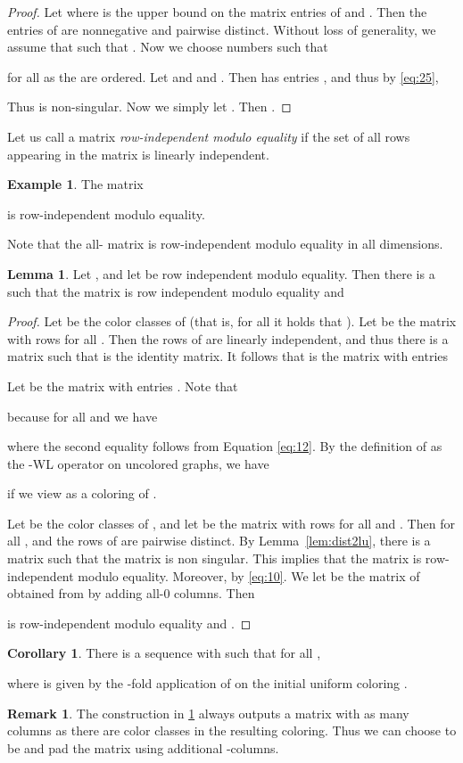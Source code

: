 \documentclass[letterpaper]{article}
\theoremstyle{definition}
\newtheorem{lemma}[theorem]{Lemma}
\newtheorem{corollary}[theorem]{Corollary}
\newtheorem{example}[theorem]{Example}
\newtheorem{remark}[theorem]{Remark}
\begin{document}
\begin{proof}
	Let  where  is the upper bound on the matrix entries of   and . 
	Then the entries of  are nonnegative and pairwise distinct.
	Without loss of generality, we assume that  such that . Now we choose numbers  such that
	
	for all  as the  are ordered. 
	Let  and  and . 
	Then  has entries , and thus by \eqref{eq:25}, 
	
	Thus  is non-singular. Now we simply let . Then .
\end{proof}
Let us call a matrix \emph{row-independent modulo equality} if the set
of all rows appearing in the matrix is linearly independent.

\begin{example}
	The matrix
	
	is row-independent modulo equality.
\end{example}
Note that the all- matrix  is row-independent modulo equality in all dimensions.
\begin{lemma}\label{lem:equivalencePerStep}
	Let , and let   be row independent modulo equality. 
	Then there is a  such that the matrix  is row independent modulo equality and
	
\end{lemma}
\begin{proof}
	Let  be the color
	classes of  (that is, for all  it holds that
	). Let
	 be the matrix with rows  for all . Then the rows of  are linearly independent, and thus there is a matrix 
	 such that  is the  identity
	matrix. 
	It follows that  is the matrix with entries
		
	
	Let  be
	the matrix with entries . Note that
	
	because for all  and  we have
	
	where the second equality follows from Equation \eqref{eq:12}. By the definition of  as the -WL operator on uncolored graphs, we have
	
	if we view  as a coloring of .
				
	Let  be the color classes of , and let  be the matrix
	with rows  for all  and . Then  for all , and the rows of
	 are pairwise distinct. By Lemma~\ref{lem:dist2lu}, there is a
	matrix  such that the matrix
	 is non singular. This implies
	that the matrix  is row-independent modulo
	equality. Moreover,  by \eqref{eq:10}. We let  be the matrix of obtained from
	 by adding  all-0 columns. Then 
	
	is row-independent modulo equality and
	. 
\end{proof}
\begin{corollary}
	There is a sequence  with
	 such that for all ,
	
	where  is given by the -fold application of  on the initial uniform coloring .
\end{corollary}
\begin{remark}\label{rem:fixedSizeOutput}
	The construction in \cref{lem:equivalencePerStep} always outputs a matrix with as many columns as there are color classes in the resulting coloring.
	Thus we can choose  to be  and pad the matrix using additional -columns.
\end{remark}
\end{document}
